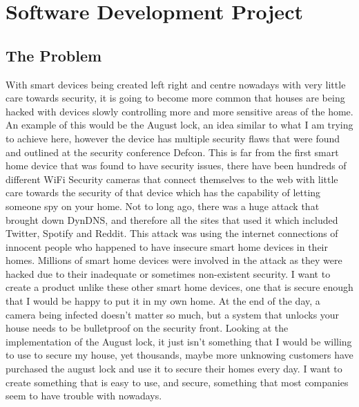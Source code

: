 \chapter{Software Development Project}
\label{chap:software_development_project}



\section{The Problem}
With smart devices being created left right and centre nowadays with very little care towards security, it is going to become more common that houses are being hacked with devices slowly controlling more and more sensitive areas of the home. An example of this would be the August lock, an idea similar to what I am trying to achieve here, however the device has multiple security flaws that were found and outlined at the security conference Defcon. This is far from the first smart home device that was found to have security issues, there have been hundreds of different WiFi Security cameras that connect themselves to the web with little care towards the security of that device which has the capability of letting someone spy on your home. Not to long ago, there was a huge attack that brought down DynDNS, and therefore all the sites that used it which included Twitter, Spotify and Reddit. This attack was using the internet connections of innocent people who happened to have insecure smart home devices in their homes. Millions of smart home devices were involved in the attack as they were hacked due to their inadequate or sometimes non-existent security.
\newline
\newline
I want to create a product unlike these other smart home devices, one that is secure enough that I would be happy to put it in my own home. At the end of the day, a camera being infected doesn't matter so much, but a system that unlocks your house needs to be bulletproof on the security front. Looking at the implementation of the August lock, it just isn't something that I would be willing to use to secure my house, yet thousands, maybe more unknowing customers have purchased the august lock and use it to secure their homes every day. I want to create something that is easy to use, and secure, something that most companies seem to have trouble with nowadays.

